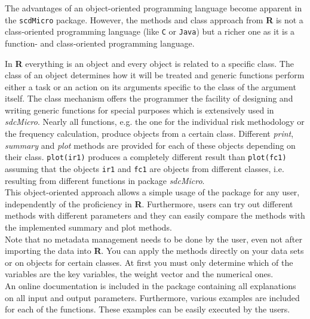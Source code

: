 \documentclass[12pt]{article}
\begin{document}

The advantages of an object-oriented programming language become apparent in the {\tt scdMicro} package.
However, the methods and class approach from {\bf R} is not a class-oriented programming language (like {\tt C} or {\tt Java}) but a richer one as it is a function- and class-oriented programming language. 

In {\bf R} everything is an object and every object is related to a specific class. The class of an object determines how it will be treated and generic functions perform either a task or an action on its arguments specific to the class of the argument itself. The class mechanism offers the programmer the facility of designing and writing generic functions for special purposes which is extensively used in {\it sdcMicro}. Nearly all functions, e.g. the one for the individual risk methodology or the frequency calculation, produce objects from a certain class. Different {\it print}, {\it summary} and {\it plot} methods are provided for each of these objects depending on their class. {\tt plot(ir1)} produces a completely different result than {\tt plot(fc1)} assuming that the objects {\tt ir1} and {\tt fc1} are objects from different classes, i.e. resulting from different functions in package {\it sdcMicro}. \\
This object-oriented approach allows a simple usage of the package for any user, independently of the proficiency in {\bf R}. Furthermore, users can try out different methods with different parameters and they can easily compare the methods with the implemented summary and plot methods.\\


Note that no metadata management needs to be done by the user, even not after importing the data into {\bf R}. You can apply the methods directly on your data sets or on objects for certain classes. At first you must only determine which of the variables are the key variables, the weight vector and the numerical ones. \\
An online documentation is included in the package containing all explanations on all input and output parameters. Furthermore, various examples are included for each of the functions. These examples can be easily executed by the users.
\end{document}
